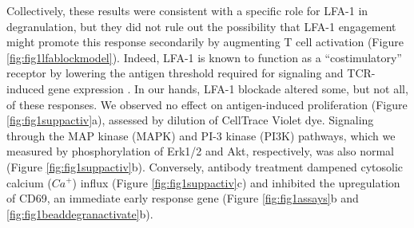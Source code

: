 Collectively, these results were consistent with a specific role for LFA-1 in degranulation, but they did not rule out the possibility that LFA-1 engagement might promote this response secondarily by augmenting T cell activation (Figure \ref{fig:fig1lfablockmodel}). Indeed, LFA-1 is known to function as a “costimulatory” receptor by lowering the antigen threshold required for signaling and TCR-induced gene expression \cite{Perez2003, Suzuki2007}. In our hands, LFA-1 blockade altered some, but not all, of these responses. We observed no effect on antigen-induced proliferation (Figure \ref{fig:fig1suppactiv}a), assessed by dilution of CellTrace Violet dye. Signaling through the MAP kinase (MAPK) and PI-3 kinase (PI3K) pathways, which we measured by phosphorylation of Erk1/2 and Akt, respectively, was also normal (Figure \ref{fig:fig1suppactiv}b). Conversely, antibody treatment dampened cytosolic calcium ($Ca^{+}$) influx (Figure \ref{fig:fig1suppactiv}c) and inhibited the upregulation of CD69, an immediate early response gene (Figure \ref{fig:fig1assays}b and \ref{fig:fig1beaddegranactivate}b). 

